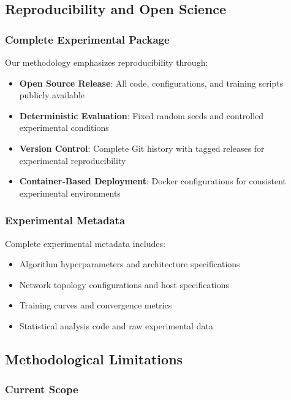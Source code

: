 \subsection{Reproducibility and Open Science}

\subsubsection{Complete Experimental Package}

Our methodology emphasizes reproducibility through:

\begin{itemize}
    \item \textbf{Open Source Release}: All code, configurations, and training scripts publicly available
    \item \textbf{Deterministic Evaluation}: Fixed random seeds and controlled experimental conditions
    \item \textbf{Version Control}: Complete Git history with tagged releases for experimental reproducibility
    \item \textbf{Container-Based Deployment}: Docker configurations for consistent experimental environments
\end{itemize}

\subsubsection{Experimental Metadata}

Complete experimental metadata includes:

\begin{itemize}
    \item Algorithm hyperparameters and architecture specifications
    \item Network topology configurations and host specifications  
    \item Training curves and convergence metrics
    \item Statistical analysis code and raw experimental data
\end{itemize}

\subsection{Methodological Limitations}

\subsubsection{Current Scope}

